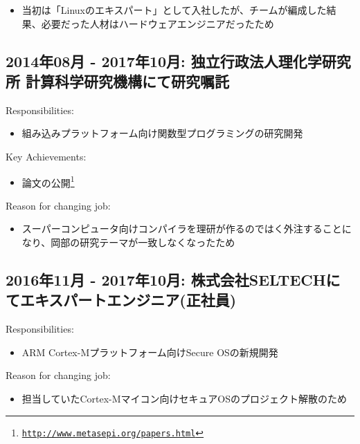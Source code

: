 \documentclass[letterpaper]{article}
\begin{document}
\begin{itemize}
  \item 当初は「Linuxのエキスパート」として入社したが、チームが編成した結果、必要だった人材はハードウェアエンジニアだったため
\end{itemize}

\subsection*{2014年08月 - 2017年10月: 独立行政法人理化学研究所 計算科学研究機構にて研究嘱託}

\noindent Responsibilities:

\begin{itemize}
  \item 組み込みプラットフォーム向け関数型プログラミングの研究開発
\end{itemize}

\noindent Key Achievements:

\begin{itemize}
  \item 論文の公開\footnote{\href{http://www.metasepi.org/papers.html}{\tt http://www.metasepi.org/papers.html}}
\end{itemize}

\noindent Reason for changing job:

\begin{itemize}
  \item スーパーコンピュータ向けコンパイラを理研が作るのではく外注することになり、岡部の研究テーマが一致しなくなったため
\end{itemize}

\subsection*{2016年11月 - 2017年10月: 株式会社SELTECHにてエキスパートエンジニア(正社員)}

\noindent Responsibilities:

\begin{itemize}
  \item ARM Cortex-Mプラットフォーム向けSecure OSの新規開発
\end{itemize}

\noindent Reason for changing job:

\begin{itemize}
  \item 担当していたCortex-Mマイコン向けセキュアOSのプロジェクト解散のため
\end{itemize}
\end{document}
